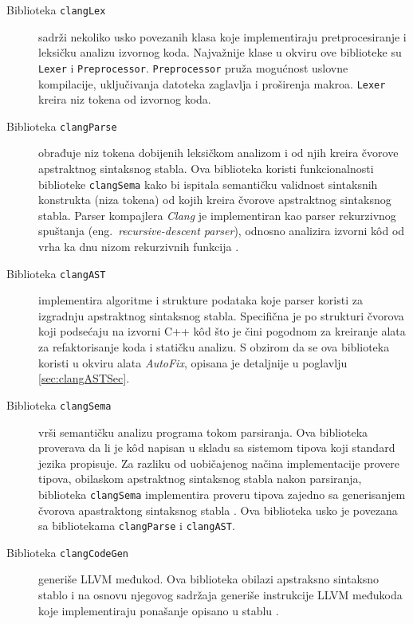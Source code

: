 \documentclass[12pt,oneside]{memoir}
\begin{document}
\begin{description}
  \item[Biblioteka \texttt{clangLex}] sadr\v{z}i nekoliko usko povezanih klasa koje implementiraju pretprocesiranje i leksi\v{c}ku analizu izvornog koda. Najva\v{z}nije klase u okviru ove biblioteke
       su \texttt{Lexer} i  \texttt{Preprocessor}.
       \texttt{Preprocessor} pru\v{z}a mogućnost uslovne kompilacije, uključivanja datoteka zaglavlja i proširenja makroa.
       \texttt{Lexer} kreira niz tokena od izvornog koda.
  \item[Biblioteka \texttt{clangParse}]
        obrađuje niz tokena dobijenih leksi\v{c}kom analizom i od njih kreira \v{c}vorove apstraktnog sintaksnog stabla. Ova biblioteka koristi funkcionalnosti 
        biblioteke \texttt{clangSema} kako bi ispitala semanti\v{c}ku validnost sintaksnih konstrukta (niza tokena) od kojih kreira \v{c}vorove apstraktnog sintaksnog stabla.
        Parser kompajlera \textit{Clang} je implementiran kao parser rekurzivnog spuštanja (eng.~\textit{recursive-descent parser}), odnosno analizira izvorni k\^{o}d od vrha ka dnu nizom rekurzivnih funkcija \cite{LLVMCoreLibraries}.
  \item[Biblioteka \texttt{clangAST}]
        implementira algoritme i strukture podataka koje parser koristi za izgradnju apstraktnog sintaksnog stabla. Specifična je po strukturi čvorova koji podsećaju na izvorni C++ k\^{o}d što je čini pogodnom za kreiranje alata za refaktorisanje koda i statičku analizu. S obzirom da se ova biblioteka koristi u okviru alata \textit{AutoFix}, opisana je detaljnije u poglavlju \ref{sec:clangASTSec}.
  \item[Biblioteka \texttt{clangSema}]
        vrši semantičku analizu programa tokom parsiranja. Ova biblioteka proverava da li je k\^{o}d napisan u skladu sa sistemom tipova koji standard jezika propisuje. Za razliku od uobi\v{c}ajenog na\v{c}ina implementacije provere tipova, obilaskom apstraktnog sintaksnog stabla nakon parsiranja, biblioteka \texttt{clangSema} implementira proveru tipova zajedno sa generisanjem \v{c}vorova apastraktong sintaksnog stabla \cite{LLVMCoreLibraries}. Ova biblioteka usko je povezana sa bibliotekama \texttt{clangParse} i \texttt{clangAST}.
  \item[Biblioteka \texttt{clangCodeGen}]
        generiše LLVM međukod. Ova biblioteka obilazi apstraksno sintaksno stablo i na osnovu njegovog sadr\v{z}aja generi\v{s}e instrukcije
        LLVM međukoda koje implementiraju pona\v{s}anje opisano u stablu \cite{LLVMCoreLibraries}.
\end{description}
\end{document}

